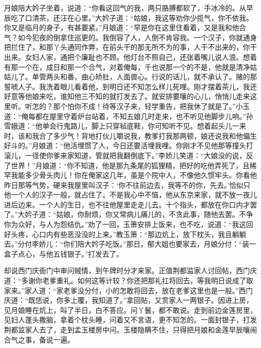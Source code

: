 月娘陪大妗子坐着，说道：“你看这回气的我，两只胳膊都软了，手冰冷的。从早辰吃了口清茶，还汪在心里。”大妗子道：“姑娘，我这等劝你少揽气，你不依我。你又是临月的身子，有甚要紧。”月娘道：“早是你在这里住看着，又是我和他合气？如今犯夜的倒拿住巡更的。我倒容了人，人倒不肯容我。一个汉子，你就通身把拦住了，和那丫头通同作弊，在前头干的那无所不为的事，人干不出来的，你干出来。女妇人家，通把个廉耻也不顾。他灯台不照自己，还张着嘴儿说人浪。想着有那一个在，成日和那一个合气，对着俺每，千也说那一个的不是，他就是清净姑姑儿了。单管两头和番，曲心矫肚，人面兽心。行说的话儿，就不承认了。赌的那誓唬人子。我洗着眼儿看着他，到明日还不知怎么样儿死哩。刚才摆着茶儿，我还好意等他娘来吃，谁知他三不知的就打发去了。就安排要嚷的心儿，悄悄儿走来这里听。听怎的？那个怕你不成！待等汉子来，轻学重告，把我休了就是了。”小玉道：“俺每都在屋里守着炉台站着，不知五娘几时走来，也不听见他脚步儿响。”孙雪娥道：“他单会行鬼路儿，脚上只穿毡底鞋，你可知听不见。想着起头儿一来时，该和我合了多少气！背地打伙儿嚼说我，教爹打我那两顿，娘还说我和他偏生好斗的。”月娘道：“他活埋惯了人，今日还要活埋我哩。你刚才不见他那等撞头打滚儿，一径使你爹来家知道，管就把我翻倒底下。”李娇儿笑道：“大娘没的说，反了世界！”月娘道：“你不知道，他是那九条尾的狐狸精，把好的吃他弄死了，且稀罕我能多少骨头肉儿！你在俺家这几年，虽是个院中人，不像他久惯牢头。你看他昨日那等气势，硬来我屋里叫汉子：‘你不往前边去，我等不的你，先去。’恰似只他一个人的汉子一般，就占住了。不是我心中不恼，他从东京来家，就不放一夜儿进后边来。一个人的生日，也不往他屋里走走儿去。十个指头，都放在你口内才罢了。”大妗子道：“姑娘，你耐烦，你又常病儿痛儿的，不贪此事，随他去罢。不争你为众好，与人为怨结仇。”劝了一回，玉箫安排上饭来，也不吃，说道：“我这回好头疼，心口内有些恶没没的上来。”教玉箫：“那边炕上，放下枕头，我且躺躺去。”分付李娇儿：“你们陪大妗子吃饭。”那日，郁大姐也要家去，月娘分付：“装一盒子点心，与他五钱银子。”打发去了。

却说西门庆衙门中审问贼情，到午牌时分才来家。正值荆都监家人讨回帖，西门庆道：“多谢你老爹重礼。如何这等计较？你还把那礼扛将回去，等我明日说成了取家来。”家人道：“家老爹没分付，小的怎敢将回去，放在老爹这里也是一般。”西门庆道：“既恁说，你多上覆，我知道了。”拿回贴，又赏家人一两银子。因进上房，见月娘睡在炕上，叫了半日，白不答应。问丫鬟，都不敢说。走到前边金莲房里，见妇人蓬头撒脑，拿着个枕头睡，问着又不言语，更不知怎的。一面封银子，打发荆都监家人去了，走到孟玉楼房中问。玉楼隐瞒不住，只得把月娘和金莲早辰嚷闹合气之事，备说一遍。

